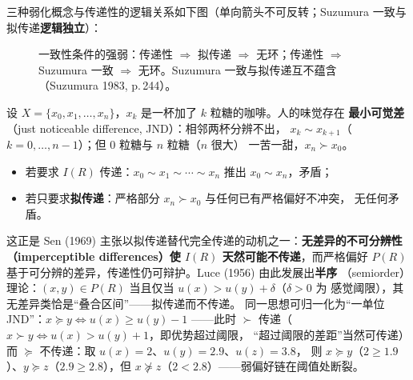 三种弱化概念与传递性的逻辑关系如下图（单向箭头不可反转；Suzumura 一致与拟传递\textbf{逻辑独立}）：

\begin{figure}[H]
\centering
{}
\caption{一致性条件的强弱：传递性 $\Rightarrow$ 拟传递 $\Rightarrow$ 无环；传递性 $\Rightarrow$ Suzumura 一致 $\Rightarrow$ 无环。Suzumura 一致与拟传递互不蕴含（Suzumura 1983, p.\,244）。}
\label{fig:coherence}
\end{figure}

\begin{example}\label{ex:luce}
设 $X=\{x_0,x_1,\dots,x_n\}$，$x_k$ 是一杯加了 $k$ 粒糖的咖啡。人的味觉存在
\textbf{最小可觉差}（just noticeable difference, JND）：相邻两杯分辨不出，
$x_k\sim x_{k+1}$（$k=0,\dots,n-1$）；但 $0$ 粒糖与 $n$ 粒糖（$n$ 很大）
一苦一甜，$x_n\succ x_0$。
\begin{itemize}
  \item 若要求 $I(R)$ 传递：$x_0\sim x_1\sim\cdots\sim x_n$ 推出 $x_0\sim x_n$，矛盾；
  \item 若只要求\textbf{拟传递}：严格部分 $x_n\succ x_0$ 与任何已有严格偏好不冲突，
  无任何矛盾。
\end{itemize}
这正是 Sen (1969) 主张以拟传递替代完全传递的动机之一：\textbf{无差异的不可分辨性
（imperceptible differences）使 $I(R)$ 天然可能不传递}，而严格偏好 $P(R)$
基于可分辨的差异，传递性仍可辩护。Luce (1956) 由此发展出\textbf{半序}
（semiorder）理论：$(x,y)\in P(R)$ 当且仅当 $u(x)>u(y)+\delta$（$\delta>0$ 为
感觉阈限），其无差异类恰是“叠合区间”——拟传递而不传递。
同一思想可归一化为“一单位 JND”：$x\succeq y \iff u(x)\ge u(y)-1$
——此时 $\succ$ 传递（$x\succ y \iff u(x)>u(y)+1$，即优势超过阈限，
“超过阈限的差距”当然可传递）而 $\succeq$ 不传递：取 $u(x)=2$、$u(y)=2.9$、$u(z)=3.8$，
则 $x\succeq y$（$2\ge 1.9$）、$y\succeq z$（$2.9\ge 2.8$），但
$x\not\succeq z$（$2<2.8$）——弱偏好链在阈值处断裂。
\end{example}

